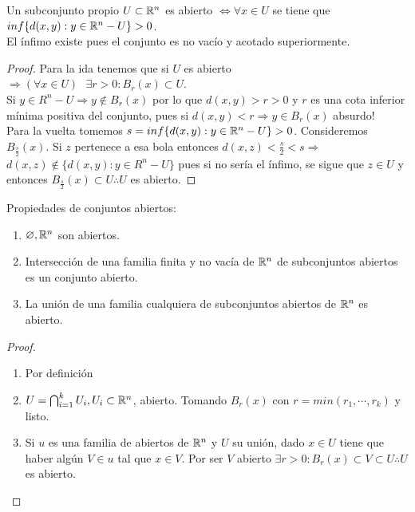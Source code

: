 \begin{prop}
  Un subconjunto propio $U \subset \mathbb{R}^n$ es abierto $\iff \forall x \in U$ se tiene que $inf\{d(x, y) : y \in \mathbb{R}^n - U\} > 0$. \\
  El ínfimo existe pues el conjunto es no vacío y acotado superiormente.
  \begin{proof}
    Para la ida tenemos que si $U$ es abierto $\Rightarrow (\forall x \in U) \text{ } \exists r > 0 : B_r(x) \subset U$. \\
    Si $y \in R^n - U \Rightarrow y \notin B_r(x)$ por lo que $d(x, y) > r > 0$ y $r$ es una cota inferior mínima positiva del conjunto, pues si $d(x,y) < r \Rightarrow y \in B_r(x)$ absurdo! \\

    Para la vuelta tomemos $s = inf\{ d(x,y) : y \in \mathbb{R}^n - U \} > 0$. Consideremos $B_{\frac{s}{2}}(x)$. Si $z$ pertenece a esa bola entonces $d(x, z) < \frac{s}{2} < s \Rightarrow$ \\
    $d(x, z) \notin \{ d(x,y) : y \in R^n - U \}$ pues si no sería el ínfimo, se sigue que $z \in U$ y entonces $B_{\frac{s}{2}}(x) \subset U \therefore U$ es abierto.
  \end{proof}
\end{prop}

\begin{prop}
  Propiedades de conjuntos abiertos:
  \begin{enumerate}
    \item $\varnothing, \mathbb{R}^n$ son abiertos.
    \item Intersección de una familia finita y no vacía de $\mathbb{R}^n$ de subconjuntos abiertos es un conjunto abierto.
    \item La unión de una familia cualquiera de subconjuntos abiertos de $\mathbb{R}^n$ es abierto.
  \end{enumerate}
  \begin{proof}
    \begin{enumerate}
      \item Por definición
      \item $U = \bigcap_{i = 1}^k U_i, U_i \subset \mathbb{R}^n$, abierto. Tomando $B_r(x)$ con $r = min(r_1, \cdots, r_k)$ y listo.
      \item Si $u$ es una familia de abiertos de $\mathbb{R}^n$ y $U$ su unión, dado $x \in U$ tiene que haber algún $V \in u$ tal que $x \in V$. Por ser $V$ abierto $\exists r > 0 : B_r(x) \subset V \subset U \therefore U$ es abierto.
    \end{enumerate}
  \end{proof}
\end{prop}

